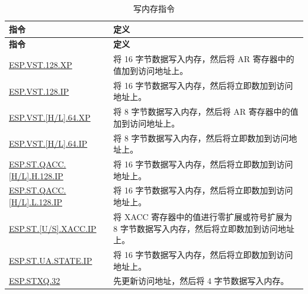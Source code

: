 \begin{longtable}[c]{|l|m{11cm}|}
    \caption{写内存指令}
    \label{tab:pie-store-instructions}\\
    \hline
    \rowcolor{lightgray}
        \textbf{指令} & \textbf{定义} \\\hline
    \endfirsthead
    \rowcolor{lightgray}
    \textbf{指令} & \textbf{定义} \\\hline
    \endhead
    \endfoot

    \hyperref[instruction:ESPVST128XP]{ESP.VST.128.XP} & 将 16 字节数据写入内存，然后将 AR 寄存器中的值加到访问地址上。 \\\hline
    \hyperref[instruction:ESPVST128IP]{ESP.VST.128.IP} & 将 16 字节数据写入内存，然后将立即数加到访问地址上。 \\\hline
    \hyperref[instruction:ESPVSTH64XP]{ESP.VST.[H/L].64.XP} & 将 8 字节数据写入内存，然后将 AR 寄存器中的值加到访问地址上。 \\\hline
    \hyperref[instruction:ESPVSTH64IP]{ESP.VST.[H/L].64.IP} & 将 8 字节数据写入内存，然后将立即数加到访问地址上。 \\\hline

    \hyperref[instruction:ESPSTQACC_HH128IP]{ESP.ST.QACC.[H/L].H.128.IP} & 将 16 字节数据写入内存，然后将立即数加到访问地址上。 \\\hline
    \hyperref[instruction:ESPSTQACC_HL128IP]{ESP.ST.QACC.[H/L].L.128.IP} & 将 16 字节数据写入内存，然后将立即数加到访问地址上。 \\\hline
    \hyperref[instruction:ESPSTUXACCIP]{ESP.ST.[U/S].XACC.IP} & 将 XACC 寄存器中的值进行零扩展或符号扩展为 8 字节数据写入内存，然后将立即数加到访问地址上。 \\\hline
    \hyperref[instruction:ESPSTUA_STATEIP]{ESP.ST.UA.STATE.IP} & 将 16 字节数据写入内存，然后将立即数加到访问地址上。 \\\hline
    \hyperref[instruction:ESPSTXQ32]{ESP.STXQ.32} & 先更新访问地址，然后将 4 字节数据写入内存。 \\\hline

\end{longtable}
